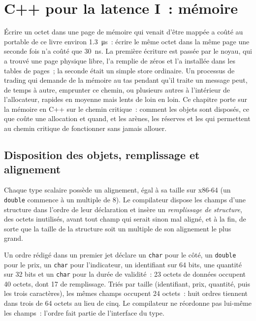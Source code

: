 \chapter{C++ pour la latence I~: mémoire}\label{ch:ll:cpp-for-latency-i-memory}

Écrire un octet dans une page de mémoire qui venait d'être mappée a coûté au portable de ce livre environ \qty{1.3}{\micro\second}~:
écrire le même octet dans la même page une seconde fois n'a coûté que \qty{30}{\nano\second}. La première écriture est passée par le noyau,
qui a trouvé une page physique libre, l'a remplie de zéros et l'a installée dans les tables de pages~; la seconde était un simple store ordinaire. Un
processus de trading qui demande de la mémoire au tas pendant qu'il traite un message peut, de temps à autre, emprunter ce chemin, ou plusieurs
autres à l'intérieur de l'allocateur, rapides en moyenne mais lents de loin en loin. Ce chapitre porte sur la mémoire en C++ sur
le chemin critique~: comment les objets sont disposés, ce que coûte une allocation et quand, et les arènes, les réserves et les 
qui permettent au chemin critique de fonctionner sans jamais allouer.

\section{Disposition des objets, remplissage et alignement}

\begin{definition}\label{def:ll:cpp-for-latency-i-memory:padding}
Chaque type scalaire possède un alignement, égal à sa taille sur x86-64 (un \texttt{double} commence à un multiple de 8). Le
compilateur dispose les champs d'une structure dans l'ordre de leur déclaration et insère un
\emph{remplissage de structure}, des octets inutilisés, avant tout champ qui serait sinon mal aligné, et à la fin, de sorte que la taille de la structure
soit un multiple de son alignement le plus grand.
\end{definition}

\begin{example}\label{ex:ll:cpp-for-latency-i-memory:layout}
Un ordre rédigé dans un premier jet déclare un \texttt{char} pour le côté, un \texttt{double} pour le prix, un \texttt{char} pour l'indicateur, un identifiant sur 64 bits,
une quantité sur 32 bits et un \texttt{char} pour la durée de validité~: 23 octets de données occupent 40 octets, dont 17 de remplissage. Triés par taille
(identifiant, prix, quantité, puis les trois caractères), les mêmes champs occupent 24 octets~: huit ordres tiennent dans trois  de 64 octets
au lieu de cinq. Le compilateur ne réordonne pas lui-même les champs~: l'ordre fait partie de l'interface du type.
\end{example}

